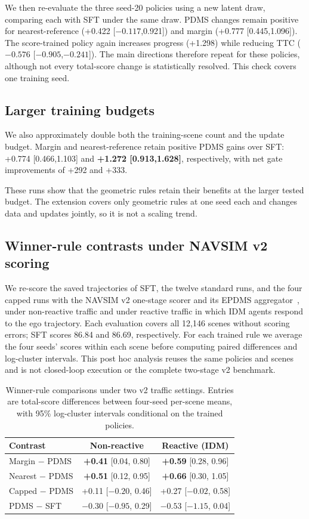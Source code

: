 \documentclass[letterpaper,10pt,conference]{ieeeconf}
\begin{document}
We then re-evaluate the three seed-20 policies using a new latent draw, comparing each with SFT under the same draw.
PDMS changes remain positive for nearest-reference
(+0.422 [$-0.117$,0.921]) and margin
(+0.777 [0.445,1.096]). The score-trained policy again
increases progress (+1.298) while reducing TTC
($-0.576$ [$-0.905$,$-0.241$]).
The main directions therefore repeat for these policies,
although not every total-score change is statistically
resolved. This check covers one training seed.

\subsection{Larger training budgets}
We also approximately double both the training-scene count
and the update budget. Margin and nearest-reference retain
positive PDMS gains over SFT: +0.774 [0.466,1.103] and
\textbf{+1.272 [0.913,1.628]}, respectively, with net gate
improvements of +292 and +333.

These runs show that the geometric rules retain their benefits at the larger tested budget. The extension covers only geometric rules at one seed each and changes data and updates jointly, so it is not a scaling trend.



\subsection{Winner-rule contrasts under NAVSIM v2 scoring}\label{sec:v2}
We re-score the saved trajectories of SFT, the twelve standard runs, and the four capped runs with the NAVSIM v2 one-stage scorer and its EPDMS aggregator~\cite{navsimv2}, under non-reactive traffic and under reactive traffic in which IDM agents respond to the ego trajectory. Each evaluation covers all 12,146 scenes without scoring errors; SFT scores 86.84 and 86.69, respectively. For each trained rule we average the four seeds' scores within each scene before computing paired differences and log-cluster intervals. This post hoc analysis reuses the same policies and scenes and is not closed-loop execution or the complete two-stage v2 benchmark.

\begin{table}[t]
\centering\small
\caption{Winner-rule comparisons under two v2 traffic settings. Entries are total-score differences between four-seed per-scene means, with 95\% log-cluster intervals conditional on the trained policies. }
\label{tab:v2}
\setlength{\tabcolsep}{3pt}
\begin{tabular}{@{}lcc@{}}
\toprule
Contrast & Non-reactive & Reactive (IDM) \\
\midrule
Margin $-$ PDMS & \textbf{+0.41} [0.04, 0.80] & \textbf{+0.59} [0.28, 0.96] \\
Nearest $-$ PDMS & \textbf{+0.51} [0.12, 0.95] & \textbf{+0.66} [0.30, 1.05] \\
Capped $-$ PDMS & +0.11 [$-0.20$, 0.46] & +0.27 [$-0.02$, 0.58] \\
PDMS $-$ SFT & $-0.30$ [$-0.95$, 0.29] & $-0.53$ [$-1.15$, 0.04] \\
\bottomrule
\end{tabular}
\end{table}
\end{document}
